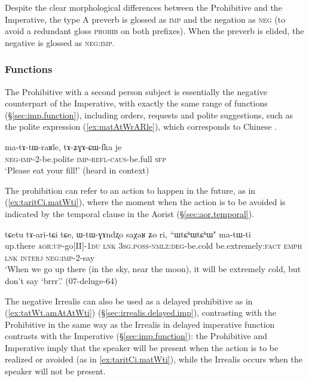 Despite the clear morphological differences between the Prohibitive and the Imperative, the type A preverb is glossed as \textsc{imp} and the negation as \textsc{neg} (to avoid a redundant gloss \textsc{prohib} on both prefixes). When the preverb is elided, the negative  is glossed as \textsc{neg}:\textsc{imp}.
 
\subsubsection{Functions} \label{sec:prohib.function}
The Prohibitive with a second person subject is essentially the negative counterpart of the Imperative, with exactly the same range of functions (§\ref{sec:imp.function}), including orders,  requests and polite suggestions, such as the polite expression  (\ref{ex:matAtWrARle}), which corresponds to Chinese .

\begin{exe}
\ex  \label{ex:matAtWrARle}
\gll ma-tɤ-tɯ-raʁle, tɤ-ʑɣɤ-ɕɯ-fka je\\
\textsc{neg}-\textsc{imp}-2-be.polite \textsc{imp}-\textsc{refl}-\textsc{caus}-be.full \textsc{sfp} \\
\glt `Please eat your fill!' (heard in context)
\end{exe}

The prohibition can refer to an action to happen in the future, as in (\ref{ex:taritCi.matWti}), where the moment when the action is to be avoided is indicated by the temporal clause in the Aorist (§\ref{sec:aor.temporal}).

\begin{exe}
\ex  \label{ex:taritCi.matWti}
\gll tɕetu tɤ-ari-tɕi tɕe, ɯ-tɯ-ɣɤndʐo saχaʁ ʑo ri, ``ɯtɕʰɯtɕʰɯ" ma-tɯ-ti \\
up.there \textsc{aor}:\textsc{up}-go[II]-\textsc{1du} \textsc{lnk} \textsc{3sg}.\textsc{poss}-\textsc{nmlz}:\textsc{deg}-be.cold be.extremely:\textsc{fact} \textsc{emph} \textsc{lnk} \textsc{interj} \textsc{neg}:\textsc{imp}-2-say \\
\glt `When we go up there (in the sky, near the moon), it will be extremely cold, but don't say `brrr'.' (07-deluge-64)
\end{exe}

The negative Irrealis can also be used as a delayed prohibitive as in (\ref{ex:tatWt.amAtAtWti}) (§\ref{sec:irrealis.delayed.imp}), contrasting with the Prohibitive in the same way as the Irrealis in delayed imperative function contrasts with the Imperative (§\ref{sec:imp.function}): the Prohibitive and Imperative imply that the speaker will be present when the action is to be realized or avoided (as in \ref{ex:taritCi.matWti}), while the Irrealis occurs when the speaker will not be present. 

